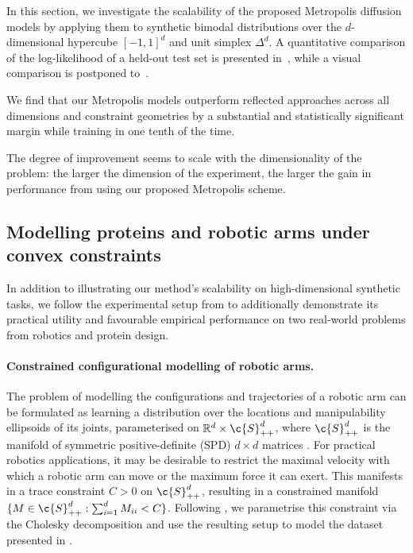 In this section, we investigate the scalability of the proposed Metropolis diffusion models by applying them to synthetic bimodal distributions over the \(d\)-dimensional hypercube \([-1, 1]^d\) and unit simplex \(\Delta^{d}\).
A quantitative comparison of the log-likelihood of a held-out test set is presented in~, while a visual comparison is postponed to~.

We find that our Metropolis models outperform reflected approaches across all dimensions and constraint geometries by a substantial and statistically significant margin while training in one tenth of the time.

The degree of improvement seems to scale with the dimensionality of the problem: the larger the dimension of the experiment, the larger the gain in performance from using our proposed Metropolis scheme.

\subsection{Modelling proteins and robotic arms under convex constraints}
\label{sec:exp_arms_and_backbones}

In addition to illustrating our method's scalability on high-dimensional synthetic tasks, we follow the experimental setup from \cite{fishman2023diffusion} to additionally demonstrate its practical utility and favourable empirical performance on two real-world problems from robotics and protein design.

\paragraph{Constrained configurational modelling of robotic arms.}
The problem of modelling the configurations and trajectories of a robotic arm can be formulated as learning a distribution over the locations and manipulability ellipsoids of its joints, parameterised on \(\R^d\times\c{S}_{++}^d\), where \(\c{S}_{++}^d\) is the manifold of symmetric positive-definite (SPD) \(d\times d\) matrices \parencite{yoshikawa1985manipulability, jaquier2021geometry}.
For practical robotics applications, it may be desirable to restrict the maximal velocity with which a robotic arm can move or the maximum force it can exert.
This manifests in a trace constraint $C>0$ on \(\c{S}_{++}^d\), resulting in a constrained manifold \(\{M\in\c{S}_{++}^d:\sum_{i=1}^dM_{ii} < C\}\).
Following \cite{fishman2023diffusion}, we parametrise this constraint via the Cholesky decomposition \parencite{lin2019riemannian} and use the resulting setup to model the dataset presented in \cite{jaquier2021geometry}.

